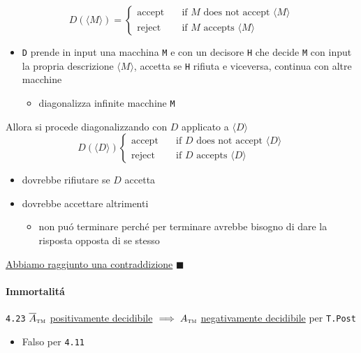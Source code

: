 \documentclass[
                        12pt, %
                        a4paper, %
                        oneside, %
                        headinclude,footinclude, %
                        BCOR5mm, %
                  ]{scrartcl}
\begin{document}
\[D(\langle M \rangle) = \begin{cases}
\text{accept} \quad &\text{if }M\text{ does not accept } \langle M \rangle \\
\text{reject} \quad &\text{if }M\text{ accepts } \langle M \rangle
\end{cases}\]

\begin{itemize}
\item \texttt{D} prende in input una macchina \texttt{M} e con un decisore \texttt{H} che decide \texttt{M} con input la propria descrizione \(\langle M \rangle\), accetta se \texttt{H} rifiuta e viceversa, continua con altre macchine
\begin{itemize}
\item diagonalizza infinite macchine \texttt{M}
\end{itemize}
\end{itemize}

Allora si procede diagonalizzando con \(D\) applicato a \(\langle D\rangle\)
\[D(\langle D \rangle)\begin{cases}
\text{accept} \quad &\text{if }D\text{ does not accept }\langle D \rangle \\
\text{reject} \quad &\text{if }D\text{ accepts }\langle D \rangle
\end{cases}\]
\begin{itemize}
\item dovrebbe rifiutare se \(D\) accetta
\item dovrebbe accettare altrimenti
\begin{itemize}
\item non puó terminare perché per terminare avrebbe bisogno di dare la risposta opposta di se stesso
\end{itemize}
\end{itemize}
\uline{Abbiamo raggiunto una contraddizione}                                                             \(\blacksquare\)

\paragraph{Immortalitá}
\label{sec:orge9f0235}
\texttt{4.23}
\(\overline A_{\textsc{tm}}\) \uline{positivamente decidibile} \(\implies  A_{\textsc{tm}}\) \uline{negativamente decidibile} per \texttt{T.Post}
\begin{itemize}
\item Falso per \texttt{4.11}
\end{itemize}
\end{document}
